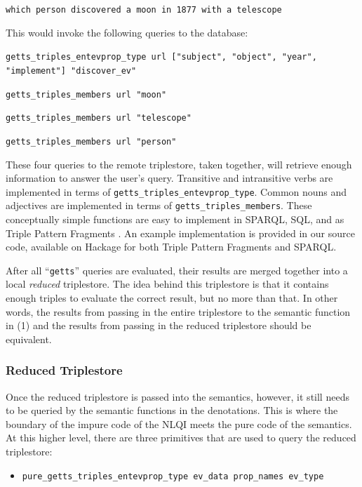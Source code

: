 \documentclass[../main.tex]{subfiles}
\begin{document}
\begin{refsection}
\examplespacing

\texttt{which person discovered a moon in 1877 with a telescope}

\examplespacing

\noindent This would invoke the following queries to the database:

\examplespacing

\texttt{getts\_triples\_entevprop\_type url ["subject", "object",  "year", \linebreak "implement"] "discover\_ev"}

\texttt{getts\_triples\_members url "moon"}

\texttt{getts\_triples\_members url "telescope"}

\texttt{getts\_triples\_members url "person"}

\examplespacing

\noindent These four queries to the remote triplestore, taken together, will retrieve enough information to answer the user's query. Transitive and intransitive verbs are implemented in terms of \texttt{getts\_triples\_entevprop\_type}. Common nouns and adjectives are implemented in terms of \texttt{getts\_triples\_members}.  These conceptually simple functions are easy to implement in SPARQL, SQL, and as Triple Pattern Fragments \cite{verborgh2014web}.  An example implementation is provided in our source code, available on Hackage \cite{xsaiga} for both Triple Pattern Fragments and SPARQL.

After all ``\texttt{getts}'' queries are evaluated, their results are merged together into a local {\em reduced} triplestore.  The idea behind this triplestore is that it contains enough triples to evaluate the correct result, but no more than that.  In other words, the results from passing in the entire triplestore to the semantic function in (1) and the results from passing in the reduced triplestore should be equivalent.

\subsubsection{Reduced Triplestore}

Once the reduced triplestore is passed into the semantics, however, it still needs to be queried by the semantic functions in the denotations.  This is where the boundary of the impure code of the NLQI meets the pure code of the semantics. At this higher level, there are three primitives that are used to query the reduced triplestore:
\begin{itemize}
	\item \texttt{pure\_getts\_triples\_entevprop\_type ev\_data prop\_names ev\_type}


\end{itemize}
\end{refsection}
\end{document}
